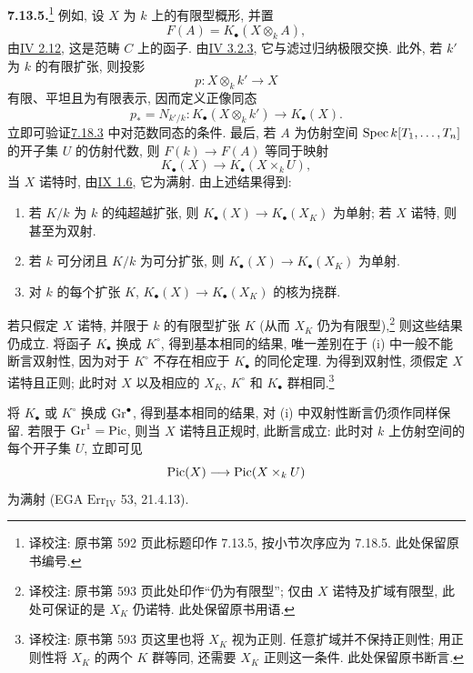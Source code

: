 \textbf{7.13.5.}\footnote{译校注: 原书第 592 页此标题印作 7.13.5, 按小节次序应为 7.18.5. 此处保留原书编号.} 例如, 设 $X$ 为 $k$ 上的有限型概形, 并置
%
\[
F(A)=K_\bullet(X\otimes_k A),
\]
由\hyperlink{sga6.e04.para.2-12}{IV 2.12}, 这是范畴 $C$ 上的函子. 由\hyperlink{sga6.e04.para.3-2-3}{IV 3.2.3}, 它与滤过归纳极限交换. 此外, 若 $k'$ 为 $k$ 的有限扩张, 则投影
%
%
\[
p:X\otimes_k k'\longrightarrow X
\]
有限、平坦且为有限表示, 因而定义正像同态
%
\[
p_*=N_{k'/k}:K_\bullet(X\otimes_k k')\longrightarrow K_\bullet(X).
\]
立即可验证\hyperlink{sga6.e10.para.7-18-3}{7.18.3} 中对范数同态的条件. 最后, 若 $A$ 为仿射空间 $\operatorname{Spec} k[T_1,\ldots,T_n]$ 的开子集 $U$ 的仿射代数, 则 $F(k)\to F(A)$ 等同于映射
%
%
\[
K_\bullet(X)\longrightarrow K_\bullet(X\times_k U),
\]
当 $X$ 诺特时, 由\hyperlink{sga6.e09.prop.1-6}{IX 1.6}, 它为满射. 由上述结果得到:
%
\begin{enumerate}[label=(\roman*)]
\item 若 $K/k$ 为 $k$ 的纯超越扩张, 则 $K_\bullet(X)\to K_\bullet(X_K)$ 为单射; 若 $X$ 诺特, 则甚至为双射. \item 若 $k$ 可分闭且 $K/k$ 为可分扩张, 则 $K_\bullet(X)\to K_\bullet(X_K)$ 为单射. \item 对 $k$ 的每个扩张 $K$, $K_\bullet(X)\to K_\bullet(X_K)$ 的核为挠群.
%
%
%
%
%
%
\end{enumerate}
若只假定 $X$ 诺特, 并限于 $k$ 的有限型扩张 $K$ (从而 $X_K$ 仍为有限型),\footnote{译校注: 原书第 593 页此处印作“仍为有限型”; 仅由 $X$ 诺特及扩域有限型, 此处可保证的是 $X_K$ 仍诺特. 此处保留原书用语.} 则这些结果仍成立. 将函子 $K_\bullet$ 换成 $K^\circ$, 得到基本相同的结果, 唯一差别在于 (i) 中一般不能断言双射性, 因为对于 $K^\circ$ 不存在相应于 $K_\bullet$ 的同伦定理. 为得到双射性, 须假定 $X$ 诺特且正则; 此时对 $X$ 以及相应的 $X_K$, $K^\circ$ 和 $K_\bullet$ 群相同.\footnote{译校注: 原书第 593 页这里也将 $X_K$ 视为正则. 任意扩域并不保持正则性; 用正则性将 $X_K$ 的两个 $K$ 群等同, 还需要 $X_K$ 正则这一条件. 此处保留原书断言.}
%
%
%
%
%
%
%
%

将 $K_\bullet$ 或 $K^\circ$ 换成 $\operatorname{Gr}^\bullet$, 得到基本相同的结果, 对 (i) 中双射性断言仍须作同样保留. 若限于 $\operatorname{Gr}^1=\operatorname{Pic}$, 则当 $X$ 诺特且正规时, 此断言成立: 此时对 $k$ 上仿射空间的每个开子集 $U$, 立即可见
%
%
%
%
\[
\operatorname{Pic}(X)\longrightarrow\operatorname{Pic}(X\times_k U)
\]
为满射 (EGA $\mathrm{Err}_{\mathrm{IV}}$ 53, 21.4.13).

